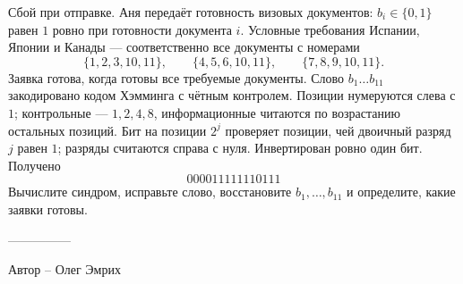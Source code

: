 \question
Сбой при отправке. Аня передаёт готовность визовых документов: $b_i\in\{0,1\}$ равен $1$ ровно при готовности документа $i$. Условные требования Испании, Японии и Канады --- соответственно все документы с номерами
\[
\{1,2,3,10,11\},\qquad \{4,5,6,10,11\},\qquad \{7,8,9,10,11\}.
\]
Заявка готова, когда готовы все требуемые документы. Слово $b_1\ldots b_{11}$ закодировано кодом Хэмминга с чётным контролем. Позиции нумеруются слева с $1$; контрольные --- $1,2,4,8$, информационные читаются по возрастанию остальных позиций. Бит на позиции $2^j$ проверяет позиции, чей двоичный разряд $j$ равен $1$; разряды считаются справа с нуля. Инвертирован ровно один бит. Получено
\[
000011111110111
\]
Вычислите синдром, исправьте слово, восстановите $b_1,\ldots,b_{11}$ и определите, какие заявки готовы.

---------------

Автор -- Олег Эмрих
